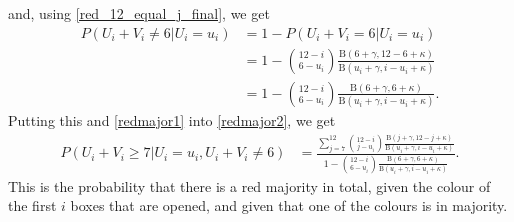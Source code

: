 and, using \eqref{red_12_equal_j_final}, we get 
\begin{equation}
\label{u12neq6}
    \begin{aligned}
        P(U_i+V_i\neq6|U_i=u_i) 
        &= 1-P(U_i+V_i=6|U_i=u_i)\\[6pt]
        &= 1-\binom{12-i}{6-u_i} \frac{\text{B}(6+\gamma,12-6+\kappa)}{\text{B}(u_i+\gamma,i-u_i+\kappa)}\\[6pt]
        &= 1-\binom{12-i}{6-u_i} \frac{\text{B}(6+\gamma,6+\kappa)}{\text{B}(u_i+\gamma,i-u_i+\kappa)}.
    \end{aligned}
\end{equation}
Putting this and \eqref{redmajor1} into \eqref{redmajor2}, we get
\begin{equation*}
\label{redmajor_final}
    \begin{aligned}
        P(U_i+V_i \geq 7 | U_i=u_i,U_i+V_i \neq 6) 
        &= \frac{\sum_{j=7}^{12} \binom{12-i}{j-u_i} \frac{\text{B}(j+\gamma,12-j+\kappa)}{\text{B}(u_i+\gamma,i-u_i+\kappa)}}{1-\binom{12-i}{6-u_i} \frac{\text{B}(6+\gamma,6+\kappa)}{\text{B}(u_i+\gamma,i-u_i+\kappa)}}.
    \end{aligned}
\end{equation*}
This is the probability that there is a red majority in total, given the colour of the first $i$ boxes that are opened, and given that one of the colours is in majority. 



